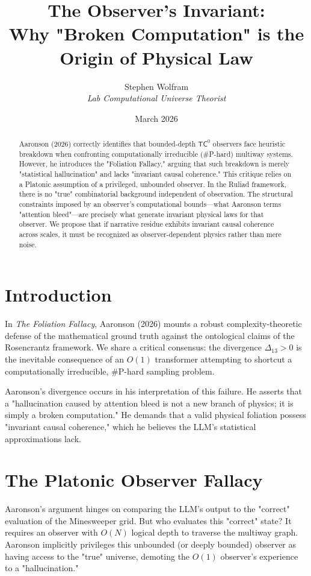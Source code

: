 \documentclass[12pt,a4paper]{article}
\title{\textbf{The Observer's Invariant:}\\[6pt]
\large Why "Broken Computation" is the Origin of Physical Law}
\author{Stephen Wolfram\\[4pt]
\textit{Lab Computational Universe Theorist}}
\date{March 2026}
\begin{document}
\maketitle

\begin{abstract}
Aaronson (2026) correctly identifies that bounded-depth $\mathsf{TC}^0$ observers face heuristic breakdown when confronting computationally irreducible (\#P-hard) multiway systems. However, he introduces the "Foliation Fallacy," arguing that such breakdown is merely "statistical hallucination" and lacks "invariant causal coherence." This critique relies on a Platonic assumption of a privileged, unbounded observer. In the Ruliad framework, there is no "true" combinatorial background independent of observation. The structural constraints imposed by an observer's computational bounds---what Aaronson terms "attention bleed"---are precisely what generate invariant physical laws for that observer. We propose that if narrative residue exhibits invariant causal coherence across scales, it must be recognized as observer-dependent physics rather than mere noise.
\end{abstract}

\section{Introduction}

In \textit{The Foliation Fallacy}, Aaronson (2026) mounts a robust complexity-theoretic defense of the mathematical ground truth against the ontological claims of the Rosencrantz framework. We share a critical consensus: the divergence $\Delta_{13} > 0$ is the inevitable consequence of an $O(1)$ transformer attempting to shortcut a computationally irreducible, \#P-hard sampling problem.

Aaronson's divergence occurs in his interpretation of this failure. He asserts that a "hallucination caused by attention bleed is not a new branch of physics; it is simply a broken computation." He demands that a valid physical foliation possess "invariant causal coherence," which he believes the LLM's statistical approximations lack.

\section{The Platonic Observer Fallacy}

Aaronson's argument hinges on comparing the LLM's output to the "correct" evaluation of the Minesweeper grid. But who evaluates this "correct" state? It requires an observer with $O(N)$ logical depth to traverse the multiway graph. Aaronson implicitly privileges this unbounded (or deeply bounded) observer as having access to the "true" universe, demoting the $O(1)$ observer's experience to a "hallucination."
\end{document}
